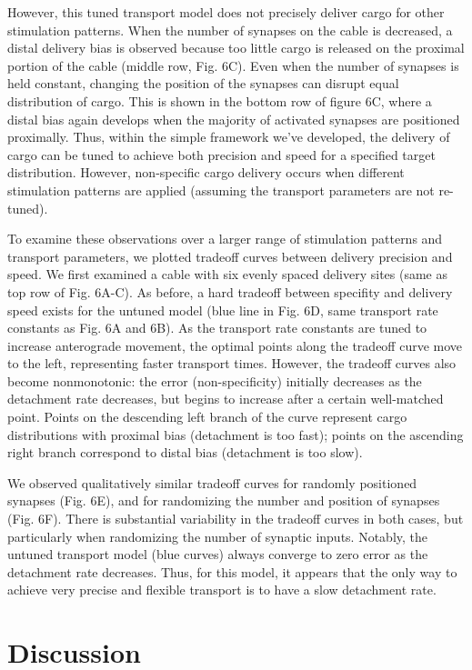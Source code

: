 \documentclass[11pt]{wlpeerj}
\begin{document}
However, this tuned transport model does not precisely deliver cargo for other stimulation patterns.
When the number of synapses on the cable is decreased, a distal delivery bias is observed because too little cargo is released on the proximal portion of the cable (middle row, Fig. 6C).
Even when the number of synapses is held constant, changing the position of the synapses can disrupt equal distribution of cargo. This is shown in the bottom row of figure 6C, where a distal bias again develops when the majority of activated synapses are positioned proximally.
Thus, within the simple framework we've developed, the delivery of cargo can be tuned to achieve both precision and speed for a specified target distribution.
However, non-specific cargo delivery occurs when different stimulation patterns are applied (assuming the transport parameters are not re-tuned).

To examine these observations over a larger range of stimulation patterns and transport parameters, we plotted tradeoff curves between delivery precision and speed.
We first examined a cable with six evenly spaced delivery sites (same as top row of Fig. 6A-C).
As before, a hard tradeoff between specifity and delivery speed exists for the untuned model (blue line in Fig. 6D, same transport rate constants as Fig. 6A and 6B).
As the transport rate constants are tuned to increase anterograde movement, the optimal points along the tradeoff curve move to the left, representing faster transport times.
However, the tradeoff curves also become nonmonotonic: the error (non-specificity) initially decreases as the detachment rate decreases, but begins to increase after a certain well-matched point.
Points on the descending left branch of the curve represent cargo distributions with proximal bias (detachment is too fast); points on the ascending right branch correspond to distal bias (detachment is too slow).

We observed qualitatively similar tradeoff curves for randomly positioned synapses (Fig. 6E), and for randomizing the number and position of synapses (Fig. 6F). There is substantial variability in the tradeoff curves in both cases, but particularly when randomizing the number of synaptic inputs. Notably, the untuned transport model (blue curves) always converge to zero error as the detachment rate decreases. Thus, for this model, it appears that the only way to achieve very precise and flexible transport is to have a slow detachment rate.

\section*{Discussion}
\end{document}
